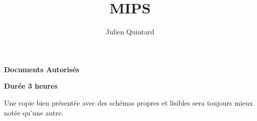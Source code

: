
%
%



%
%


%
%

\title{MIPS}

%
%

\author{\small{Julien Quintard}}

%
%



%
%

\maketitle

%
%

\begin{center}

\textbf{Documents Autoris\'es}

\textbf{Dur\'ee 3 heures}

\scriptsize{Une copie bien pr\'esent\'ee avec des sch\'emas propres et
	    lisibles sera toujours mieux not\'ee qu'une autre.}
\end{center}

%
%


